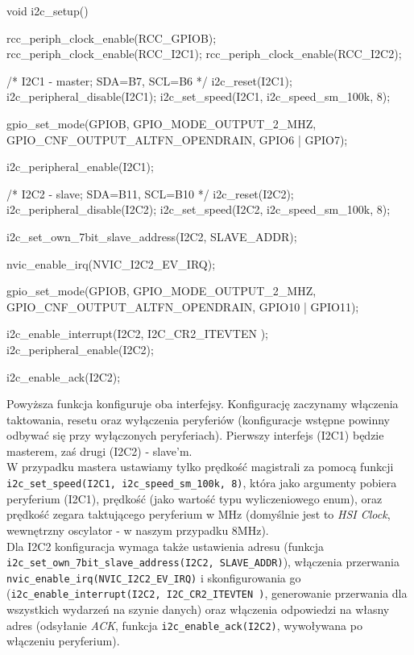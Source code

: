 \documentclass{pdfBooklets}
\begin{document}
\begin{CodeFrame*}[c]{}
void i2c_setup(){
  rcc_periph_clock_enable(RCC_GPIOB);
  rcc_periph_clock_enable(RCC_I2C1);
  rcc_periph_clock_enable(RCC_I2C2);


  /* I2C1 - master; SDA=B7, SCL=B6 */
  i2c_reset(I2C1);
  i2c_peripheral_disable(I2C1);
  i2c_set_speed(I2C1, i2c_speed_sm_100k, 8);

  gpio_set_mode(GPIOB, GPIO_MODE_OUTPUT_2_MHZ,
		  GPIO_CNF_OUTPUT_ALTFN_OPENDRAIN, GPIO6 | GPIO7);
  
  i2c_peripheral_enable(I2C1);


  /* I2C2 - slave; SDA=B11, SCL=B10 */
  i2c_reset(I2C2);
  i2c_peripheral_disable(I2C2);
  i2c_set_speed(I2C2, i2c_speed_sm_100k, 8);

  i2c_set_own_7bit_slave_address(I2C2, SLAVE_ADDR);

  nvic_enable_irq(NVIC_I2C2_EV_IRQ);
  
  gpio_set_mode(GPIOB, GPIO_MODE_OUTPUT_2_MHZ,
		  GPIO_CNF_OUTPUT_ALTFN_OPENDRAIN, GPIO10 | GPIO11);

  i2c_enable_interrupt(I2C2, I2C_CR2_ITEVTEN );
  i2c_peripheral_enable(I2C2);

  
  i2c_enable_ack(I2C2);
}
\end{CodeFrame*}

Powyższa funkcja konfiguruje oba interfejsy. Konfigurację zaczynamy włączenia taktowania, resetu oraz wyłączenia peryferiów (konfiguracje wstępne
powinny odbywać się przy wyłączonych peryferiach). Pierwszy interfejs (I2C1) będzie masterem,
zaś drugi (I2C2) - slave'm.\\

W przypadku mastera ustawiamy tylko prędkość magistrali za pomocą funkcji
\Verb$i2c_set_speed(I2C1, i2c_speed_sm_100k, 8)$, która jako argumenty pobiera peryferium (I2C1), prędkość (jako wartość typu wyliczeniowego enum),
oraz prędkość zegara taktującego peryferium w MHz (domyślnie jest to \textit{HSI Clock}, wewnętrzny oscylator - w naszym przypadku 8MHz).\\

Dla I2C2 konfiguracja wymaga także ustawienia adresu (funkcja \Verb$i2c_set_own_7bit_slave_address(I2C2, SLAVE_ADDR)$), włączenia przerwania
\Verb$nvic_enable_irq(NVIC_I2C2_EV_IRQ)$ i skonfigurowania go (\Verb$i2c_enable_interrupt(I2C2, I2C_CR2_ITEVTEN )$, generowanie przerwania dla wszystkich wydarzeń na szynie danych) oraz włączenia odpowiedzi na własny adres (odsyłanie \textit{ACK}, funkcja \Verb$i2c_enable_ack(I2C2)$,
wywoływana po włączeniu peryferium).
\end{document}
